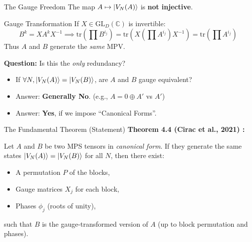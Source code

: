 \documentclass[aspectratio=169,10pt]{beamer}
\newcommand{\trace}{\mathrm{tr}}
\begin{document}
\begin{frame}{The Gauge Freedom}
    The map $A \mapsto \ket{V_N(A)}$ is \textbf{not injective}.
    
    \vspace{1em}
    \begin{block}{Gauge Transformation}
        If $X \in \mathrm{GL}_D(\mathbb{C})$ is invertible:
        \[
            B^k = X A^k X^{-1} \implies \trace(\prod B^{i_j}) = \trace(X (\prod A^{i_j}) X^{-1}) = \trace(\prod A^{i_j})
        \]
        Thus $A$ and $B$ generate the \emph{same} MPV.
    \end{block}

    \vspace{1em}
    \textbf{Question:} Is this the \emph{only} redundancy?
    \begin{itemize}
        \item If $\forall N, \ket{V_N(A)} = \ket{V_N(B)}$, are $A$ and $B$ gauge equivalent?
        \item Answer: \textbf{Generally No}. (e.g., $A = 0 \oplus A'$ vs $A'$)
        \item Answer: \textbf{Yes}, if we impose ``Canonical Forms''.
    \end{itemize}
\end{frame}

\begin{frame}{The Fundamental Theorem (Statement)}
    \textbf{Theorem 4.4 (Cirac et al., 2021) \cite{Cirac2021Matrix}:}
    
    Let $A$ and $B$ be two MPS tensors in \emph{canonical form}.
    If they generate the same states $\ket{V_N(A)} = \ket{V_N(B)}$ for all $N$, then there exist:
    \begin{itemize}
        \item A permutation $P$ of the blocks,
        \item Gauge matrices $X_j$ for each block,
        \item Phases $\phi_j$ (roots of unity),
    \end{itemize}
    such that $B$ is the gauge-transformed version of $A$ (up to block permutation and phases).

    \vspace{1em}
    \begin{center}
    \end{center}
\end{frame}
\end{document}
